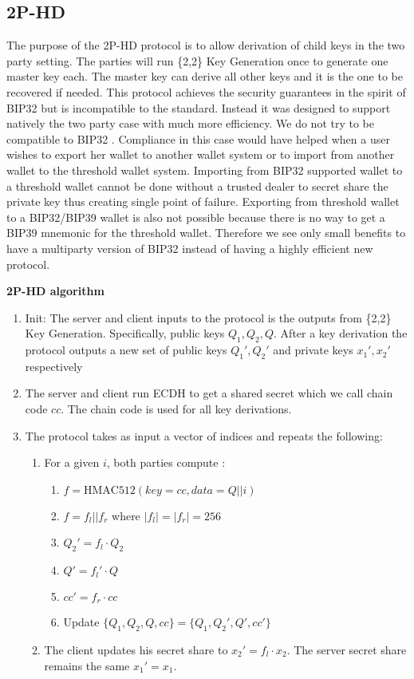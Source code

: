 \documentclass[runningheads]{llncs}
\begin{document}
{{\subsection{2P-HD} 
The purpose of the 2P-HD protocol is to allow derivation of child keys in the two party setting. The parties will run \{2,2\} Key Generation once to generate one master key each. The master key can derive all other keys and it is the one to be recovered if needed. This protocol achieves the security guarantees in the spirit of BIP32 \cite{bip32} but is incompatible to the standard. Instead it was designed to support natively the two party case with much more efficiency. We do not try to be compatible to BIP32 \cite{bip32}. Compliance in this case would have helped when a user wishes to export her wallet to another wallet system or to import from another wallet to the threshold wallet system. Importing from BIP32 supported wallet to a threshold wallet cannot be done without a trusted dealer to secret share the private key thus creating single point of failure. Exporting from threshold wallet to a BIP32/BIP39 wallet is also not possible because there is no way to get a BIP39 mnemonic for the threshold wallet. Therefore we see only small benefits to have a multiparty version of BIP32 instead of having a highly efficient new protocol.
\begin{mdframed}[userdefinedwidth = 12.3cm]
\textbf{2P-HD algorithm}
\begin{enumerate}
\item Init: The server and client inputs to the protocol is the outputs from \{2,2\} Key Generation. Specifically, public keys $Q_1,Q_2,Q$. After a key derivation the protocol outputs a new set of public keys $Q_1',Q_2'$ and private keys  $x_1', x_2'$ respectively 
\item The server and client run ECDH to get a shared secret which we call chain code $cc$. The chain code is used for all key derivations.
\item The protocol takes as input a vector of indices and repeats the following:
\begin{enumerate}
\item For a given $i$, both parties compute :
\begin{enumerate}
\item ${f = \mathrm{HMAC512}(key=cc, data = Q|| i )}$
\item ${f=f_l||f_r}$ where ${|f_l|=|f_r|=256}$
\item ${Q_2' = f_l\cdot Q_2}$  
\item $Q' = f_l' \cdot Q$
\item ${cc' = f_r \cdot cc}$
\item Update $\{Q_1,Q_2,Q, cc\} = \{Q_1,Q_2',Q', cc'\}$
\end{enumerate}
\item The client updates his secret share to $x_2' = f_l \cdot x_2$. The server secret share remains the same $x_1'=x_1$.
\end{enumerate}
\end{enumerate}
\end{mdframed}


}}
\end{document}
